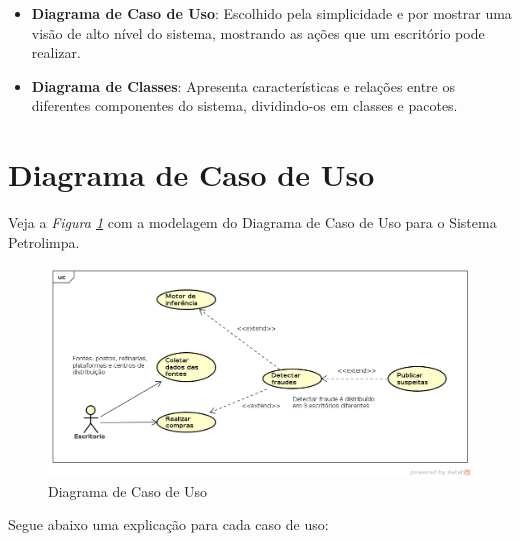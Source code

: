 \documentclass[a4paper,10pt]{article}
\begin{document}
\begin{itemize}
  \item \textbf{Diagrama de Caso de Uso}: Escolhido pela simplicidade e por mostrar
        uma visão de alto nível do sistema, mostrando as ações que um escritório
        pode realizar.
  \item \textbf{Diagrama de Classes}: Apresenta características e relações entre os
        diferentes componentes do sistema, dividindo-os em classes e pacotes.
\end{itemize}

\newpage


\section{Diagrama de Caso de Uso}

Veja a \emph{Figura \ref{uc}} com a modelagem do Diagrama de Caso de Uso para o
Sistema Petrolimpa.

\begin{figure}[ht]
  \centering
  \includegraphics[width=1\textwidth, keepaspectratio=true]{images/uc.png}
  \caption {Diagrama de Caso de Uso}
  \label {uc}
\end{figure}

Segue abaixo uma explicação para cada caso de uso:
\end{document}
